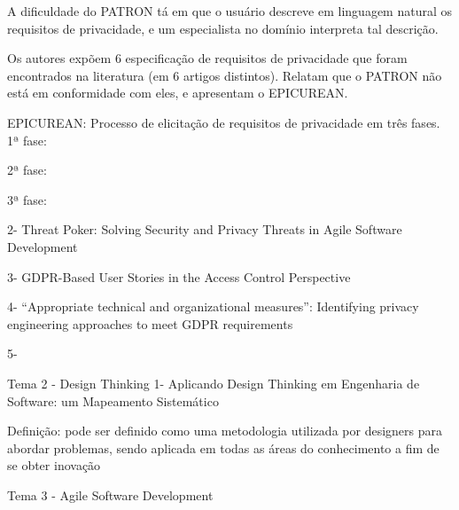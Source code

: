 A dificuldade do PATRON tá em que o usuário descreve em linguagem natural os requisitos de privacidade, e um especialista no domínio interpreta tal descrição.

Os autores expõem 6 especificação de requisitos de privacidade que foram encontrados na literatura (em 6 artigos distintos). Relatam que o PATRON não está em conformidade com eles, e apresentam o EPICUREAN.  


EPICUREAN: Processo de elicitação de requisitos de privacidade em três fases.
1ª fase:

2ª fase:

3ª fase:



2- Threat Poker: Solving Security and Privacy Threats in Agile Software Development




3- GDPR-Based User Stories in the Access Control Perspective





4- “Appropriate technical and organizational measures”: Identifying privacy engineering approaches to meet GDPR requirements



5- 






Tema 2 - Design Thinking
1- Aplicando Design Thinking em Engenharia de Software: um Mapeamento Sistemático

Definição: pode ser definido como uma metodologia utilizada por designers para abordar problemas, sendo aplicada em todas as áreas do conhecimento a fim de se obter inovação

Tema 3 - Agile Software Development
